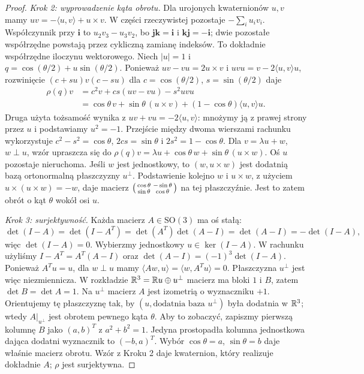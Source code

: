 \begin{proof}
\emph{Krok 2: wyprowadzenie kąta obrotu.}
Dla urojonych kwaternionów $u,v$ mamy
$uv=-\langle u,v\rangle+u\times v$.
W części rzeczywistej pozostaje $-\sum_i u_iv_i$.
Współczynnik przy $\mathbf i$ to $u_2v_3-u_3v_2$,
bo $\mathbf j\mathbf k=\mathbf i$ i
$\mathbf k\mathbf j=-\mathbf i$; dwie pozostałe
współrzędne powstają przez cykliczną zamianę indeksów.
To dokładnie współrzędne iloczynu wektorowego.
Niech $|u|=1$ i
$q=\cos(\theta/2)+u\sin(\theta/2)$.
Ponieważ $uv-vu=2u\times v$ i
$uvu=v-2\langle u,v\rangle u$, rozwinięcie
$(c+su)v(c-su)$ dla
$c=\cos(\theta/2)$, $s=\sin(\theta/2)$ daje
\begin{align*}
 \rho(q)v
 &=c^2v+cs(uv-vu)-s^2uvu\\
 &=\cos\theta\,v+
   \sin\theta\,(u\times v)+
   (1-\cos\theta)\langle u,v\rangle u.
\end{align*}
Druga użyta tożsamość wynika z
$uv+vu=-2\langle u,v\rangle$: mnożymy ją z prawej strony
przez $u$ i podstawiamy $u^2=-1$.
Przejście między dwoma wierszami rachunku wykorzystuje
$c^2-s^2=\cos\theta$, $2cs=\sin\theta$ i
$2s^2=1-\cos\theta$.
Dla $v=\lambda u+w$, $w\perp u$, wzór upraszcza się do
$\rho(q)v=\lambda u+\cos\theta\,w+\sin\theta\,(u\times w)$.
Oś $u$ pozostaje nieruchoma.
Jeśli $w$ jest jednostkowy, to $(w,u\times w)$ jest
dodatnią bazą ortonormalną płaszczyzny $u^\perp$.
Podstawienie kolejno $w$ i $u\times w$, z użyciem
$u\times(u\times w)=-w$, daje macierz
$\begin{psmallmatrix}\cos\theta&-\sin\theta\\
\sin\theta&\cos\theta\end{psmallmatrix}$ na tej płaszczyźnie.
Jest to zatem obrót o kąt $\theta$ wokół osi $u$.

\emph{Krok 3: surjektywność.}
Każda macierz $A\in\mathrm{SO}(3)$ ma oś stałą:
\[
 \det(I-A)=\det(I-A^T)
 =\det(A^T)\det(A-I)
 =\det(A-I)=-\det(I-A),
\]
więc $\det(I-A)=0$. Wybierzmy jednostkowy
$u\in\ker(I-A)$.
W rachunku użyliśmy $I-A^T=A^T(A-I)$ oraz
$\det(A-I)=(-1)^3\det(I-A)$.
Ponieważ $A^Tu=u$, dla $w\perp u$ mamy
$\langle Aw,u\rangle=\langle w,A^Tu\rangle=0$.
Płaszczyzna $u^\perp$ jest więc niezmiennicza.
W rozkładzie $\mathbb{R}^3=\mathbb{R} u\oplus u^\perp$ macierz ma bloki
$1$ i $B$, zatem $\det B=\det A=1$.
Na $u^\perp$ macierz $A$ jest izometrią o wyznaczniku $+1$.
Orientujemy tę płaszczyznę
tak, by $(u,\text{dodatnia baza }u^\perp)$ była dodatnia
w $\mathbb{R}^3$; wtedy $A|_{u^\perp}$ jest obrotem pewnego
kąta $\theta$. Aby to zobaczyć, zapiszmy pierwszą kolumnę $B$
jako $(a,b)^T$ z $a^2+b^2=1$.
Jedyna prostopadła kolumna jednostkowa dająca dodatni wyznacznik
to $(-b,a)^T$. Wybór $\cos\theta=a$, $\sin\theta=b$
daje właśnie macierz obrotu.
Wzór z Kroku 2 daje kwaternion,
który realizuje dokładnie $A$; $\rho$ jest surjektywna.


\end{proof}
